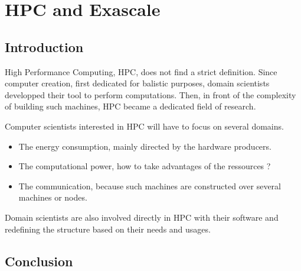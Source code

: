 \part{HPC and Exascale}
\chapter*{Introduction}

High Performance Computing, HPC, does not find a strict definition. 
Since computer creation, first dedicated for balistic purposes, domain scientists developped their tool to perform computations. 
Then, in front of the complexity of building such machines, HPC became a dedicated field of research. 

Computer scientists interested in HPC will have to focus on several domains. 
\begin{itemize}
\item The energy consumption, mainly directed by the hardware producers. 
\item The computational power, how to take advantages of the ressources ? 
\item The communication, because such machines are constructed over several machines or nodes. 
\end{itemize}

Domain scientists are also involved directly in HPC with their software and redefining the structure based on their needs and usages. 











\chapter*{Conclusion}

